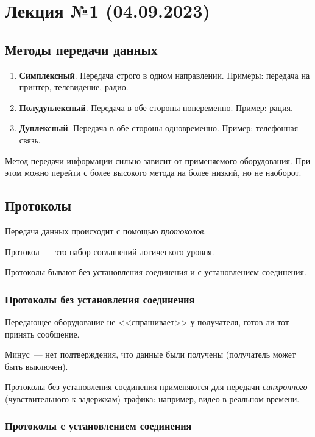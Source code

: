 \section{Лекция №1 (04.09.2023)}

\subsection{Методы передачи данных}

\begin{enumerate}
    \item \textbf{Симплексный}. Передача строго в одном направлении. Примеры: передача на принтер, телевидение, радио.
    \item \textbf{Полудуплексный}. Передача в обе стороны попеременно. Пример: рация.
    \item \textbf{Дуплексный}. Передача в обе стороны одновременно. Пример: телефонная связь.
\end{enumerate}

Метод передачи информации сильно зависит от применяемого оборудования. При этом можно перейти с более высокого метода на более низкий, но не наоборот.

\subsection{Протоколы}

Передача данных происходит с помощью \textit{протоколов}.

\begin{dd}
    Протокол~--- это набор соглашений логического уровня.
\end{dd}

Протоколы бывают без установления соединения и с установлением соединения.

\subsubsection{Протоколы без установления соединения}

Передающее оборудование не <<спрашивает>> у получателя, готов ли тот принять сообщение.

Минус~--- нет подтверждения, что данные были получены (получатель может быть выключен).

Протоколы без установления соединения применяются для передачи \textit{синхронного} (чувствительного к задержкам) трафика: например, видео в реальном времени.

\subsubsection{Протоколы с установлением соединения}

